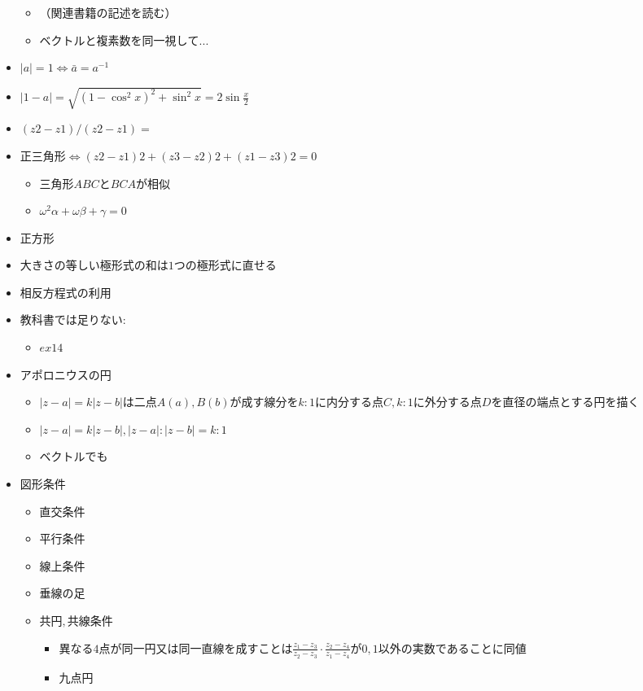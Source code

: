 \documentclass[dvipdfmx,uplatex]{jsarticle}
\begin{document}
\begin{itemize}
\begin{itemize}
		\item $ （関連書籍の記述を読む）$
		\item $ ベクトルと複素数を同一視して...$
	\end{itemize}
	\item $ |a| = 1 \Leftrightarrow \bar{a} = a^{-1} $
	\item $ |1 - a| = \sqrt{(1 - \cos^2 x)^2 + \sin^2 x} = 2 \sin \frac{x}{2}$
	\item $ (z2-z1)/(z2-z1) =$
	\item $ 正三角形\Leftrightarrow(z2-z1)2+(z3-z2)2+(z1-z3)2=0$
	\begin{itemize}
		\item $ 三角形ABCとBCAが相似$
		\item $ ω^2α+ωβ+γ=0$
	\end{itemize}
	\item $ 正方形$
	\item $ 大きさの等しい極形式の和は1つの極形式に直せる$
	\item $ 相反方程式の利用$
	\item $ 教科書では足りない:$
	\begin{itemize}
		\item $ ex14$
	\end{itemize}
	\item $ アポロニウスの円$
	\begin{itemize}
		\item $ |z-a| = k |z-b| は二点A(a),B(b)が成す線分をk:1に内分する点C,k:1に外分する点Dを直径の端点とする円を描く$
		\item $  |z-a| = k |z-b| , |z-a| : |z-b| = k : 1$
		\item ベクトルでも
	\end{itemize}
	\item $ 図形条件$
	\begin{itemize}
		\item $ 直交条件$
		\item $ 平行条件$
		\item $ 線上条件$
		\item $ 垂線の足$
		\item $ 共円,共線条件$
		\begin{itemize}
			\item $ 異なる4点が同一円又は同一直線を成すことは \frac{z_1-z_3}{z_2-z_3} \cdot \frac{z_2-z_4}{z_1-z_4}が0,1以外の実数であることに同値$
			\item $ 九点円$
		\end{itemize}
	\end{itemize}

\end{itemize}
\end{document}
